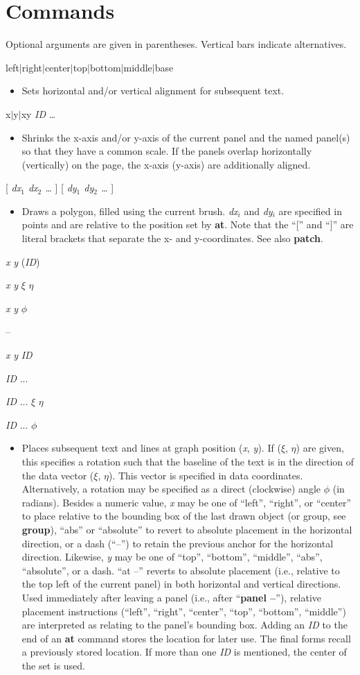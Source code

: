 \documentclass[11pt]{article}
\def\cmd#1#2{\noindent {\bf #1} #2\par}
\def\expl#1{\kern-8pt\begin{itemize}\item[]#1\end{itemize}}
\def\cref#1{{\bf #1}}
\def\bar{{$|$}}
\begin{document}
\section{Commands}
Optional arguments are given in parentheses. Vertical bars indicate
alternatives.\bigskip

\cmd{align}{left\bar{}right\bar{}center\bar{}top\bar{}bottom\bar{}middle\bar{}base}
\expl{Sets horizontal and/or vertical alignment for subsequent text.}

\cmd{alignaxes}{x\bar{}y\bar{}xy \emph{ID} \ldots}
\expl{Shrinks the x-axis and/or y-axis of the current panel and the
  named panel(s) so that they have a common scale. If the panels
  overlap horizontally (vertically) on the page, the x-axis (y-axis)
  are additionally aligned.}

\cmd{area}{[ \emph{dx$_1$ dx$_2$ \ldots} ] [ \emph{dy$_1$ dy$_2$ \ldots}
]}
\expl{Draws a polygon, filled using the current brush. 
  \emph{dx$_i$} and \emph{dy$_i$} are specified in
  points and are relative to the position set by \cref{at}. Note that
  the ``['' and ``]'' are literal brackets that separate the x- and 
  y-coordinates. See also \cref{patch}.}

\cmd{at}{\emph{x} \emph{y} (\emph{ID})}
\cmd{at}{\emph{x} \emph{y} \emph{$\xi$} \emph{$\eta$}}
\cmd{at}{\emph{x} \emph{y} \emph{$\phi$}}
\cmd{at}{--}
\cmd{at}{\emph{x} \emph{y} \emph{ID}}
\cmd{at}{\emph{ID} ...}
\cmd{at}{\emph{ID} ... \emph{$\xi$} \emph{$\eta$}}
\cmd{at}{\emph{ID} ... \emph{$\phi$}}
\expl{Places subsequent text and lines at graph position (\emph{x},
  \emph{y}). If (\emph{$\xi$}, \emph{$\eta$}) are given, this
  specifies a rotation such that the baseline of the text is in the
  direction of the data vector (\emph{$\xi$}, \emph{$\eta$}). This
  vector is specified in data coordinates. Alternatively, a rotation
  may be specified as a direct (clockwise) angle $\phi$ (in
  radians). Besides a numeric value, \emph{x} may be one of
  {``left''}, {``right''}, or {``center''} to place relative to the
  bounding box of the last drawn object (or group, see \cref{group}),
  ``abs'' or ``absolute'' to revert to absolute placement in the
  horizontal direction, or a dash (``--'') to retain the previous
  anchor for the horizontal direction.  Likewise, \emph{y} may be one
  of {``top''}, {``bottom''}, {``middle''}, ``abs'', ``absolute'', or
  a dash. ``at --'' reverts to absolute placement (i.e., relative to
  the top left of the current panel) in both horizontal and vertical
  directions.  Used immediately after
leaving a panel (i.e., after ``\cref{panel --}''), relative placement
instructions (``left'', ``right'', ``center'', ``top'', ``bottom'',
``middle'') are interpreted as relating to the panel's bounding box.
Adding an \emph{ID} to the end of an \cref{at} command stores the
location for later use. The final forms recall a previously stored
location. If more than one \emph{ID} is mentioned, the center of the
set is used.}
\end{document}
